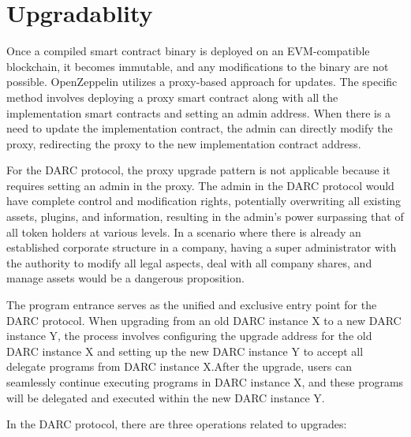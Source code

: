 \documentclass[main.tex]{subfiles}
\begin{document}
\section{Upgradablity}

Once a compiled smart contract binary is deployed on an EVM-compatible blockchain, it becomes immutable, and any modifications to the binary are not possible. OpenZeppelin \cite{proxy} \cite{ethereumERC1967Proxy} utilizes a proxy-based approach for updates. The specific method involves deploying a proxy smart contract along with all the implementation smart contracts and setting an admin address. When there is a need to update the implementation contract, the admin can directly modify the proxy, redirecting the proxy to the new implementation contract address.

For the DARC protocol, the proxy upgrade pattern is not applicable because it requires setting an admin in the proxy. The admin in the DARC protocol would have complete control and modification rights, potentially overwriting all existing assets, plugins, and information, resulting in the admin's power surpassing that of all token holders at various levels. In a scenario where there is already an established corporate structure in a company, having a super administrator with the authority to modify all legal aspects, deal with all company shares, and manage assets would be a dangerous proposition.

The program entrance serves as the unified and exclusive entry point for the DARC protocol. When upgrading from an old DARC instance X to a new DARC instance Y, the process involves configuring the upgrade address for the old DARC instance X and setting up the new DARC instance Y to accept all delegate programs from DARC instance X.After the upgrade, users can seamlessly continue executing programs in DARC instance X, and these programs will be delegated and executed within the new DARC instance Y.

In the DARC protocol, there are three operations related to upgrades:
\end{document}
